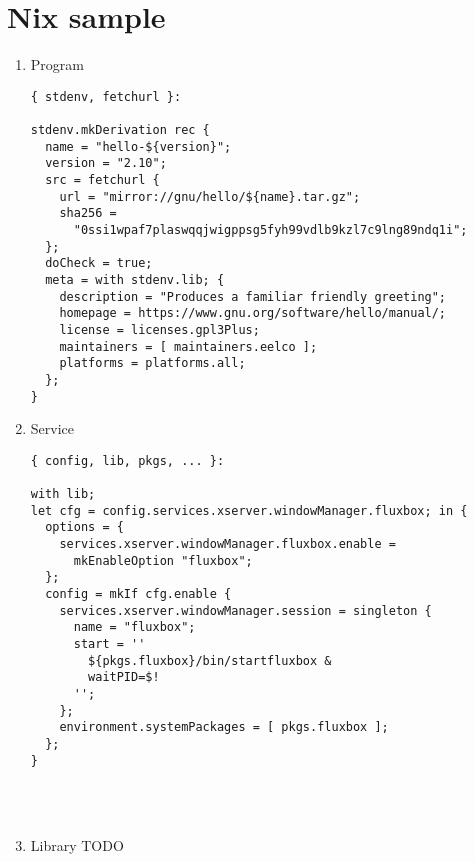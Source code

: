 \documentclass[smaller]{beamer}
\begin{document}
\section{Nix sample}
\label{sec:orgbdb5430}
\begin{enumerate}
\item Program
\label{sec:org49b0f9c}

\begin{verbatim}
{ stdenv, fetchurl }:

stdenv.mkDerivation rec {
  name = "hello-${version}";
  version = "2.10";
  src = fetchurl {
    url = "mirror://gnu/hello/${name}.tar.gz";
    sha256 =
      "0ssi1wpaf7plaswqqjwigppsg5fyh99vdlb9kzl7c9lng89ndq1i";
  };
  doCheck = true;
  meta = with stdenv.lib; {
    description = "Produces a familiar friendly greeting";
    homepage = https://www.gnu.org/software/hello/manual/;
    license = licenses.gpl3Plus;
    maintainers = [ maintainers.eelco ];
    platforms = platforms.all;
  };
}
\end{verbatim}

\item Service
\label{sec:org2e8f16b}
\begin{verbatim}
{ config, lib, pkgs, ... }:

with lib;
let cfg = config.services.xserver.windowManager.fluxbox; in {
  options = {
    services.xserver.windowManager.fluxbox.enable =
      mkEnableOption "fluxbox";
  };
  config = mkIf cfg.enable {
    services.xserver.windowManager.session = singleton {
      name = "fluxbox";
      start = ''
        ${pkgs.fluxbox}/bin/startfluxbox &
        waitPID=$!
      '';
    };
    environment.systemPackages = [ pkgs.fluxbox ];
  };
}
\end{verbatim}

\hfill\\
\hfill\\

\item Library
\label{sec:org4dba30a}
TODO\\
\end{enumerate}
\end{document}
